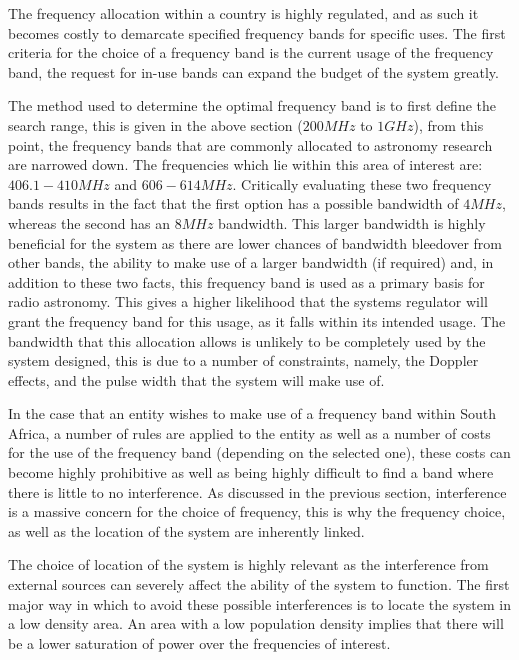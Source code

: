 \documentclass[11pt]{witseiepaper}
\begin{document}
The frequency allocation within a country is highly regulated, and as such it becomes costly to demarcate specified frequency bands for specific uses.
The first criteria for the choice of a frequency band is the current usage of the frequency band, the request for in-use bands can expand the budget of the system greatly.

The method used to determine the optimal frequency band is to first define the search range, this is given in the above section ($200 MHz$ to $1 GHz$), from this point, the frequency bands that are commonly allocated to astronomy research are narrowed down. The frequencies which lie within this area of interest are: $406.1 - 410 MHz$ and $606 - 614 MHz$. 
Critically evaluating these two frequency bands results in the fact that the first option has a possible bandwidth of $4 MHz$, whereas the second has an $8 MHz$ bandwidth. This larger bandwidth is highly beneficial for the system as there are lower chances of bandwidth bleedover from other bands, the ability to make use of a larger bandwidth (if required) and, in addition to these two facts, this frequency band is used as a primary basis for radio astronomy.
This gives a higher likelihood that the systems regulator will grant the frequency band for this usage, as it falls within its intended usage.
The bandwidth that this allocation allows is unlikely to be completely used by the system designed, this is due to a number of constraints, namely, the Doppler effects, and the pulse width that the system will make use of.

In the case that an entity wishes to make use of a frequency band within South Africa, a number of rules are applied to the entity as well as a number of costs for the use of the frequency band (depending on the selected one), these costs can become highly prohibitive as well as being highly difficult to find a band where there is little to no interference.
As discussed in the previous section, interference is a massive concern for the choice of frequency, this is why the frequency choice, as well as the location of the system are inherently linked.


The choice of location of the system is highly relevant as the interference from external sources can severely affect the ability of the system to function. The first major way in which to avoid these possible interferences is to locate the system in a low density area. An area with a low population density implies that there will be a lower saturation of power over the frequencies of interest. 
\end{document}

